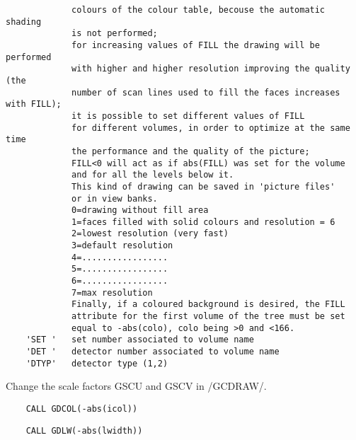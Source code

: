 \begin{verbatim}
             colours of the colour table, becouse the automatic shading
             is not performed;
             for increasing values of FILL the drawing will be performed
             with higher and higher resolution improving the quality (the
             number of scan lines used to fill the faces increases with FILL);
             it is possible to set different values of FILL
             for different volumes, in order to optimize at the same time
             the performance and the quality of the picture;
             FILL<0 will act as if abs(FILL) was set for the volume
             and for all the levels below it.
             This kind of drawing can be saved in 'picture files'
             or in view banks.
             0=drawing without fill area
             1=faces filled with solid colours and resolution = 6
             2=lowest resolution (very fast)
             3=default resolution
             4=.................
             5=.................
             6=.................
             7=max resolution
             Finally, if a coloured background is desired, the FILL
             attribute for the first volume of the tree must be set
             equal to -abs(colo), colo being >0 and <166.
    'SET '   set number associated to volume name
    'DET '   detector number associated to volume name
    'DTYP'   detector type (1,2)
\end{verbatim}

\ENDCBIG


\BEGARG
{}
\ENDARG

   \par
Change the scale factors GSCU and GSCV in /GCDRAW/.  

\ENDCMD


\BEGARG
{}
\ENDARG

\begin{verbatim}
    CALL GDCOL(-abs(icol))
\end{verbatim}

\ENDCMD


\BEGARG
{}
\ENDARG

\begin{verbatim}
    CALL GDLW(-abs(lwidth))
\end{verbatim}

